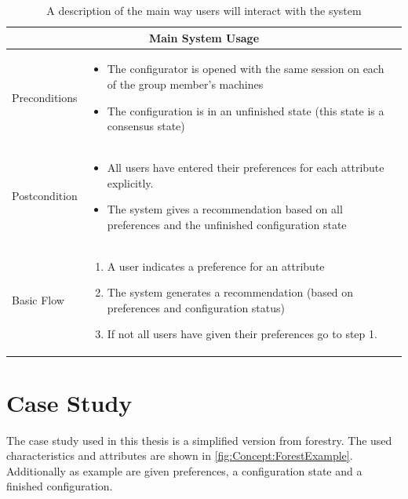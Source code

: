 \begin{table}
    \begin{center}
        \begin{tabularx}{\columnwidth}{l|X}
            \multicolumn{2}{c}{Main System Usage} \\
            \hline
            Preconditions   & 
                \begin{itemize}
                    \item The configurator is opened with the same session on each of the group member's machines
                    \item The configuration is in an unfinished state (this state is a consensus state)
                \end{itemize} \\
            \hline
            Postcondition   & 
                \begin{itemize}
                    \item All users have entered their preferences for each attribute explicitly.
                    \item The system gives a recommendation based on all preferences and the unfinished configuration state
                \end{itemize} \\
            \hline
            Basic Flow      & 
                \begin{enumerate}
                    \item A user indicates a preference for an attribute
                    \item The system generates a recommendation (based on preferences and configuration status)
                    \item If not all users have given their preferences go to step 1.
                \end{enumerate} \\
            \hline
        \end{tabularx}
        \caption{A description of the main way users will interact with the system}
        \label{tab:Concept:MainUseCase}
    \end{center}
\end{table}

\section{Case Study}
\label{sec:Concept:CaseStudy}

The case study used in this thesis is a simplified version from forestry.
The used characteristics and attributes are shown in \autoref{fig:Concept:ForestExample}. Additionally as example are given preferences, a configuration state and a finished configuration.

